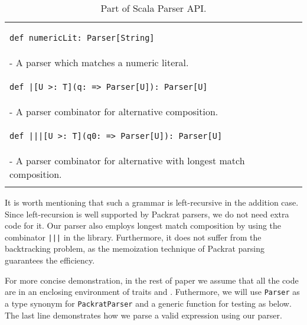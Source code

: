 \begin{table}[t]
\begin{tabular}{l}
\hline
\begin{lstlisting}
def numericLit: Parser[String]
\end{lstlisting} \\
\hspace{.2in}- A parser which matches a numeric literal. \\
\hline
\begin{lstlisting}
def |[U >: T](q: => Parser[U]): Parser[U]
\end{lstlisting} \\
\hspace{.2in}- A parser combinator for alternative composition. \\
\hline
\begin{lstlisting}
def |||[U >: T](q0: => Parser[U]): Parser[U]
\end{lstlisting} \\
\hspace{.2in}- A parser combinator for alternative with longest match composition. \\
\hline \\
\end{tabular}
\caption{Part of Scala Parser API.}\label{tab:packrat}
\end{table}

It is worth mentioning that such a grammar is left-recursive in the addition case. Since left-recursion is well supported by Packrat parsers, we do not need extra code for it. Our parser also employs longest match composition by using the combinator \lstinline{|||} in the library. Furthermore, it does not suffer from the backtracking problem, as the memoization technique of Packrat parsing guarantees the efficiency.

For more concise demonstration, in the rest of paper we assume that all the code are in an enclosing environment of traits  and . Futhermore, we will use \lstinline{Parser} as a type synonym for \lstinline{PackratParser} and a generic  function for testing as below. The last line demonstrates how we parse a valid expression  using our parser.


